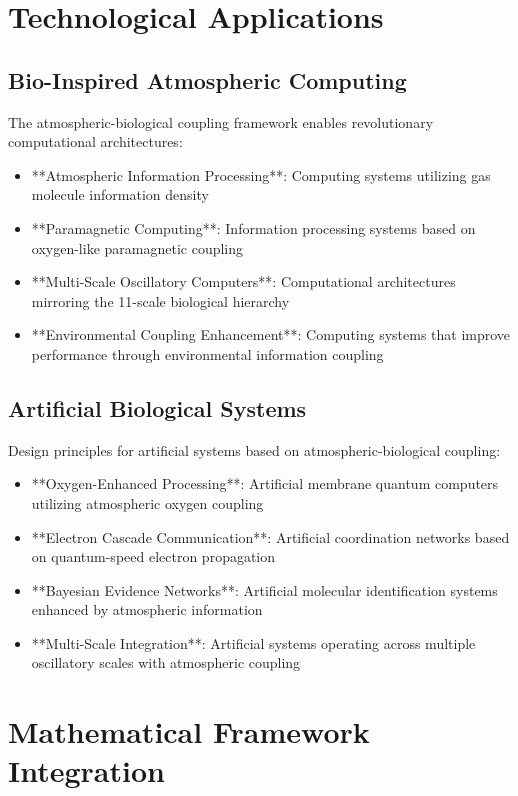 \documentclass[twocolumn]{article}
\begin{document}
\section{Technological Applications}

\subsection{Bio-Inspired Atmospheric Computing}

The atmospheric-biological coupling framework enables revolutionary computational architectures:

\begin{itemize}
\item **Atmospheric Information Processing**: Computing systems utilizing gas molecule information density
\item **Paramagnetic Computing**: Information processing systems based on oxygen-like paramagnetic coupling
\item **Multi-Scale Oscillatory Computers**: Computational architectures mirroring the 11-scale biological hierarchy
\item **Environmental Coupling Enhancement**: Computing systems that improve performance through environmental information coupling
\end{itemize}

\subsection{Artificial Biological Systems}

Design principles for artificial systems based on atmospheric-biological coupling:

\begin{itemize}
\item **Oxygen-Enhanced Processing**: Artificial membrane quantum computers utilizing atmospheric oxygen coupling
\item **Electron Cascade Communication**: Artificial coordination networks based on quantum-speed electron propagation
\item **Bayesian Evidence Networks**: Artificial molecular identification systems enhanced by atmospheric information
\item **Multi-Scale Integration**: Artificial systems operating across multiple oscillatory scales with atmospheric coupling
\end{itemize}

\section{Mathematical Framework Integration}
\end{document}
